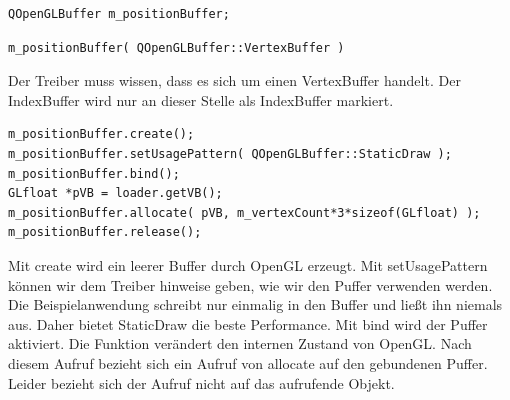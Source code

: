 \documentclass[a4paper,12pt]{article}
\begin{document}
\begin{lstlisting}[frame=single, columns=fullflexible]
QOpenGLBuffer m_positionBuffer;
\end{lstlisting}
\begin{lstlisting}[frame=single, columns=fullflexible]
m_positionBuffer( QOpenGLBuffer::VertexBuffer )
\end{lstlisting}
Der Treiber muss wissen, dass es sich um einen VertexBuffer handelt. Der IndexBuffer wird nur an dieser Stelle als IndexBuffer markiert.
\begin{lstlisting}[frame=single, columns=fullflexible]
m_positionBuffer.create();
m_positionBuffer.setUsagePattern( QOpenGLBuffer::StaticDraw );
m_positionBuffer.bind();
GLfloat *pVB = loader.getVB();
m_positionBuffer.allocate( pVB, m_vertexCount*3*sizeof(GLfloat) );
m_positionBuffer.release();
\end{lstlisting}
Mit create wird ein leerer Buffer durch OpenGL erzeugt. Mit setUsagePattern können wir dem Treiber hinweise geben, wie wir den Puffer verwenden werden. Die Beispielanwendung schreibt nur einmalig in den Buffer und ließt ihn niemals aus. Daher bietet StaticDraw die beste Performance.
Mit bind wird der Puffer aktiviert. Die Funktion verändert den internen Zustand von OpenGL. Nach diesem Aufruf bezieht sich ein Aufruf von allocate auf den gebundenen Puffer. Leider bezieht sich der Aufruf nicht auf das aufrufende Objekt.
\end{document}
